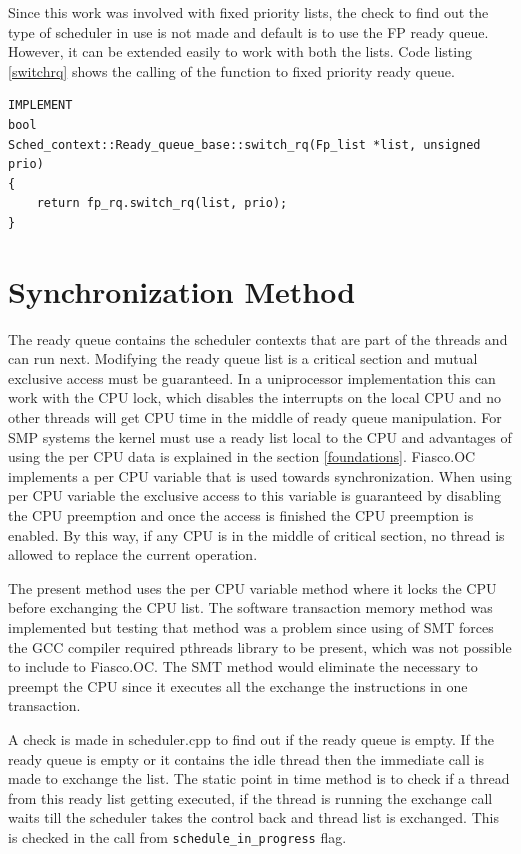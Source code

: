Since this work was involved with fixed priority lists, the check to find out the type of scheduler in use is not made and default is to use the FP ready queue. However, it can be extended easily to work with both the lists. Code listing \ref{switchrq} shows the calling of the function to fixed priority ready queue.

\begin{lstlisting}[caption={Exchanging the ready queue},label=switchrq, style=customcpp]
IMPLEMENT
bool
Sched_context::Ready_queue_base::switch_rq(Fp_list *list, unsigned prio)
{
	return fp_rq.switch_rq(list, prio);
}
\end{lstlisting}

\section{Synchronization Method}\label{imp:sync}

The ready queue contains the scheduler contexts that are part of the threads and can run next. Modifying the ready queue list is a critical section and mutual exclusive access must be guaranteed. In a uniprocessor implementation this can work with the CPU lock, which disables the interrupts on the local CPU and no other threads will get CPU time in the middle of ready queue manipulation. For SMP systems the kernel must use a ready list local to the CPU and advantages of using the per CPU data is explained in the section \ref{foundations}. Fiasco.OC implements a per CPU variable that is used towards synchronization. When using per CPU variable the exclusive access to this variable is guaranteed by disabling the CPU preemption and once the access is finished the CPU preemption is enabled. By this way, if any CPU is in the middle of critical section, no thread is allowed to replace the current operation. 

The present method uses the per CPU variable method where it locks the CPU before exchanging the CPU list. The software transaction memory method was implemented but testing that method was a problem since using of SMT forces the GCC compiler required pthreads library to be present, which was not possible to include to Fiasco.OC. The SMT method would eliminate the necessary to preempt the CPU since it executes all the exchange the instructions in one transaction.

A check is made in scheduler.cpp to find out if the ready queue is empty. If the ready queue is empty or it contains the idle thread then the immediate call is made to exchange the list. The static point in time method is to check if a thread from this ready list getting executed, if the thread is running
the exchange call waits till the scheduler takes the control back and thread list is exchanged. This is checked in the call from \texttt{schedule\_in\_progress} flag. 


